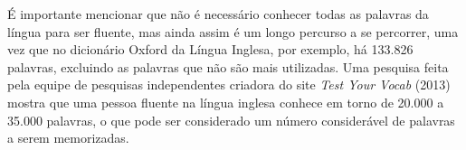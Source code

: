 É importante mencionar que não é necessário conhecer todas as palavras da língua para ser fluente, mas ainda assim é um longo percurso a se percorrer, uma vez que no dicionário Oxford da Língua Inglesa, por exemplo, há 133.826 palavras, excluindo as palavras que não são mais utilizadas. Uma pesquisa feita pela equipe de pesquisas independentes criadora do site \textit{Test Your Vocab} (2013) mostra que uma pessoa fluente na língua inglesa conhece em torno de 20.000 a 35.000 palavras, o que pode ser considerado um número considerável de palavras a serem memorizadas.




















